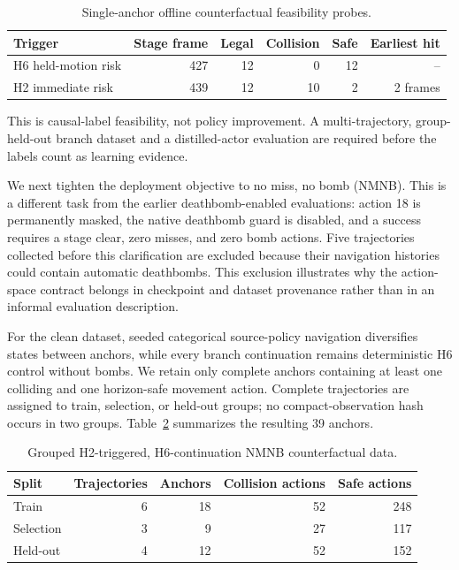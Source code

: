 \documentclass[10pt]{article}
\begin{document}
\begin{table}[ht]
  \centering
  \caption{Single-anchor offline counterfactual feasibility probes.}
  \label{tab:branch}
  \begin{tabular}{lrrrrr}
    \toprule
    Trigger & Stage frame & Legal & Collision & Safe & Earliest hit \\
    \midrule
    H6 held-motion risk & 427 & 12 & 0 & 12 & -- \\
    H2 immediate risk & 439 & 12 & 10 & 2 & 2 frames \\
    \bottomrule
  \end{tabular}
\end{table}

This is causal-label feasibility, not policy improvement.  A multi-trajectory,
group-held-out branch dataset and a distilled-actor evaluation are required
before the labels count as learning evidence.

We next tighten the deployment objective to no miss, no bomb (NMNB).  This is a
different task from the earlier deathbomb-enabled evaluations: action 18 is
permanently masked, the native deathbomb guard is disabled, and a success
requires a stage clear, zero misses, and zero bomb actions.  Five trajectories
collected before this clarification are excluded because their navigation
histories could contain automatic deathbombs.  This exclusion illustrates why
the action-space contract belongs in checkpoint and dataset provenance rather
than in an informal evaluation description.

For the clean dataset, seeded categorical source-policy navigation diversifies
states between anchors, while every branch continuation remains deterministic
H6 control without bombs.  We retain only complete anchors containing at least
one colliding and one horizon-safe movement action.  Complete trajectories are
assigned to train, selection, or held-out groups; no compact-observation hash
occurs in two groups.  Table~\ref{tab:nmnb-branches} summarizes the resulting
39 anchors.

\begin{table}[ht]
  \centering
  \caption{Grouped H2-triggered, H6-continuation NMNB counterfactual data.}
  \label{tab:nmnb-branches}
  \begin{tabular}{lrrrr}
    \toprule
    Split & Trajectories & Anchors & Collision actions & Safe actions \\
    \midrule
    Train & 6 & 18 & 52 & 248 \\
    Selection & 3 & 9 & 27 & 117 \\
    Held-out & 4 & 12 & 52 & 152 \\
    \bottomrule
  \end{tabular}
\end{table}
\end{document}
